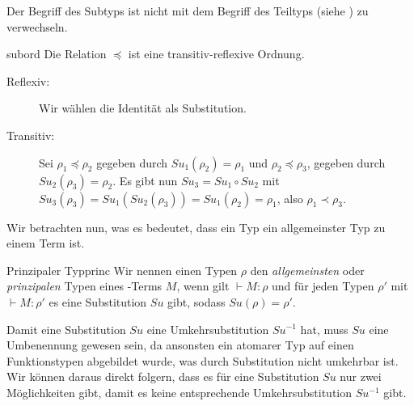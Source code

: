 \begin{remark}
    Der Begriff des Subtyps ist nicht mit dem Begriff des Teiltyps (siehe ) zu verwechseln.
\end{remark}

\begin{lemma}{}{subord}
    Die Relation $\preceq$ ist eine transitiv-reflexive Ordnung.
    \Proof
    \begin{description}
        \item[Reflexiv:] Wir wählen die Identität als Substitution.
        \item[Transitiv:] Sei $\rho_1 \preceq \rho_2$ gegeben durch $Su_1(\rho_2) = \rho_1$ und $\rho_2\preceq \rho_3$, gegeben durch $Su_2(\rho_3) = \rho_2$. Es gibt nun $Su_3 = Su_1 \circ Su_2$ mit $Su_3(\rho_3) = Su_1(Su_2(\rho_3)) = Su_1(\rho_2) = \rho_1$, also $\rho_1\prec\rho_3$.
    \end{description}
\end{lemma}

Wir betrachten nun, was es bedeutet, dass ein Typ ein allgemeinster Typ zu einem Term ist.

\begin{definition}{Prinzipaler Typ}{princ}
    Wir nennen einen Typen $\rho$ den \emph{allgemeinsten} oder \emph{prinzipalen} Typen eines \tlambda-Terms $M$, wenn gilt $\vdash M : \rho$ und für jeden Typen $\rho'$ mit $\vdash M : \rho'$ es eine Substitution $Su$ gibt, sodass $Su(\rho)=\rho'$.
\end{definition}

Damit eine Substitution $Su$ eine Umkehrsubstitution $Su^{-1}$ hat, muss $Su$ eine Umbenennung gewesen sein, da ansonsten ein atomarer Typ auf einen Funktionstypen abgebildet wurde, was durch Substitution nicht umkehrbar ist. 
Wir können daraus direkt folgern, dass es für eine Substitution $Su$ nur zwei Möglichkeiten gibt, damit es keine entsprechende Umkehrsubstitution $Su^{-1}$ gibt.

